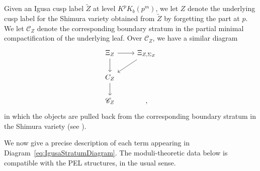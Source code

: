 \documentclass[letterpaper,11pt]{amsart}
\begin{document}
 Given an Igusa cusp label $\widetilde{Z}$ at level $K^pK_b(p^m)$, we let $Z$ denote the underlying cusp label for the Shimura variety obtained from $\widetilde{Z}$ by forgetting the part at $p$. We let $\mathscr{C}_Z$ denote the corresponding boundary stratum in the partial minimal compactification of the underlying leaf. Over $\mathscr{C}_{Z}$, we have a similar diagram 
 \begin{equation}\label{eq:LeafStratumDiagram}
      \begin{tikzcd}
       \Xi_{Z}\arrow[d]\arrow[r] & \Xi_{Z, \Sigma_Z}\arrow[dl] \\
       C_{Z}\arrow[d] & \\
       \mathscr{C}_{Z} &, 
   \end{tikzcd}
 \end{equation}  
   in which the objects are pulled back from the corresponding boundary stratum in the Shimura variety (see \cite[Theorem~6.4.1.1]{lan-thesis}).
 
 We now give a precise description of each term appearing in Diagram~\eqref{eq:IgusaStratumDiagram}. The moduli-theoretic data below is compatible with the PEL structures, in the usual sense. 
\end{document}
